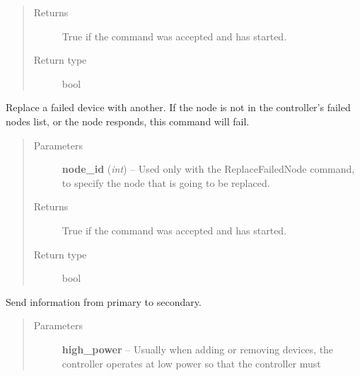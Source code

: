 \documentclass[letterpaper,10pt,english]{sphinxmanual}
\begin{document}
\begin{fulllineitems}
\begin{fulllineitems}
\begin{quote}
\begin{description}
\item[{Returns}] \leavevmode
True if the command was accepted and has started.

\item[{Return type}] \leavevmode
bool

\end{description}\end{quote}

\end{fulllineitems}


\begin{fulllineitems}
\label{controller:openzwave.controller.ZWaveController.begin_command_replace_failed_node}
Replace a failed device with another. If the node is not in
the controller's failed nodes list, or the node responds, this command will fail.
\begin{quote}\begin{description}
\item[{Parameters}] \leavevmode
\textbf{node\_id} (\emph{int}) -- Used only with the ReplaceFailedNode command, to specify the node that is going to be replaced.

\item[{Returns}] \leavevmode
True if the command was accepted and has started.

\item[{Return type}] \leavevmode
bool

\end{description}\end{quote}

\end{fulllineitems}


\begin{fulllineitems}
\label{controller:openzwave.controller.ZWaveController.begin_command_replication_send}
Send information from primary to secondary.
\begin{quote}\begin{description}
\item[{Parameters}] \leavevmode
\textbf{high\_power} -- Usually when adding or removing devices, the controller operates at low power so that the controller must


\end{description}
\end{quote}
\end{fulllineitems}
\end{fulllineitems}
\end{document}
